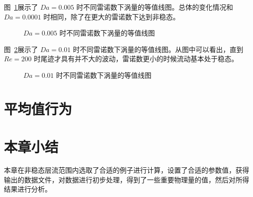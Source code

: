 图~\ref{fig: vorticity-contour-5e-3}展示了 $Da=0.005$ 时不同雷诺数下涡量的等值线图。总体的变化情况和 $Da=0.0001$ 时相同，除了在更大的雷诺数下达到非稳态。%

\begin{figure}
	\centering
	\begin{minipage}{\textwidth}
		\centering
	\end{minipage}
	\centering
	\begin{minipage}{\textwidth}
		\centering
	\end{minipage}
	\centering
	\begin{minipage}{\textwidth}
		\centering
	\end{minipage}
	\caption{$Da=0.005$ 时不同雷诺数下涡量的等值线图}%
	\label{fig: vorticity-contour-5e-3}
\end{figure}

图~\ref{fig: vorticity-contour-1e-2}展示了 $Da=0.01$ 时不同雷诺数下涡量的等值线图。从图中可以看出，直到 $Re=200$ 时尾迹才具有并不大的波动，雷诺数更小的时候流动基本处于稳态。

\begin{figure}
	\centering
	\begin{minipage}{\textwidth}
		\centering
	\end{minipage}
	\centering
	\begin{minipage}{\textwidth}
		\centering
	\end{minipage}
	\caption{$Da=0.01$ 时不同雷诺数下涡量的等值线图}
	\label{fig: vorticity-contour-1e-2}
\end{figure}

\section{平均值行为}\label{sec: average}

\section{本章小结}

本章在非稳态层流范围内选取了合适的例子进行计算，设置了合适的参数值，获得输出的数据文件，对数据进行初步处理，得到了一些重要物理量的值，然后对所得结果进行分析。
